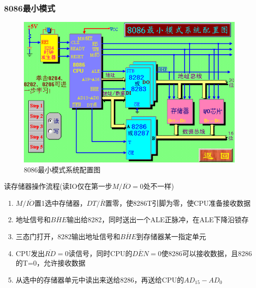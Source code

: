 \subsubsection{8086最小模式}
\begin{figure}[H]
    \centering
    \includegraphics[scale=1]{part_8086CPU/part_8086CPU_pic/8086最小模式系统配置图.png}
    \caption{8086最小模式系统配置图}
\end{figure}
读存储器操作流程(读IO仅在第一步$M/\overline{IO}=0$处不一样)
\begin{enumerate}
    \item $M/\overline{IO}$置1选中存储器，$DT/\overline{R}$置零，使8286T引脚为零，使CPU准备接收数据
    \item 地址信号和$\overline{BHE}$输出给8282，同时送出一个ALE正脉冲，在ALE下降沿锁存
    \item 三态门打开，8282输出地址信号和$\overline{BHE}$到存储器某一指定单元
    \item CPU发出$\overline{RD}=0$读信号，同时CPU的$\overline{DEN}=0$使8286可以接收数据，且8286的T=0，允许接收数据
    \item 从选中的存储器单元中读出来送给8286，再送给CPU的$AD_{15}-AD_{0}$
\end{enumerate}

